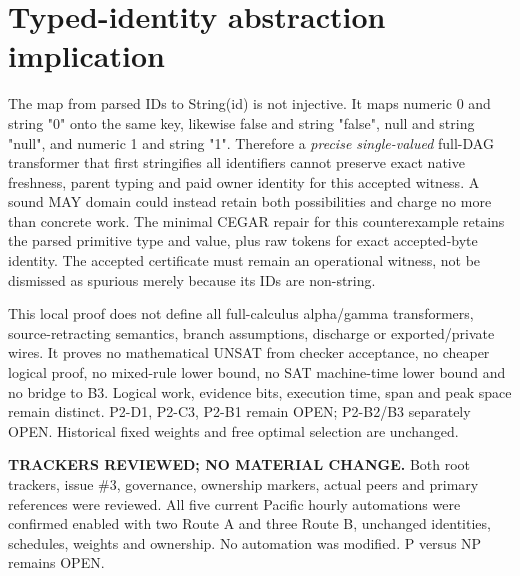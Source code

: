 \documentclass[11pt]{article}
\begin{document}
\section*{Typed-identity abstraction implication}
The map from parsed IDs to String(id) is not injective. It maps numeric 0 and string "0" onto the same key, likewise false and string "false", null and string "null", and numeric 1 and string "1". Therefore a \emph{precise single-valued} full-DAG transformer that first stringifies all identifiers cannot preserve exact native freshness, parent typing and paid owner identity for this accepted witness. A sound MAY domain could instead retain both possibilities and charge no more than concrete work. The minimal CEGAR repair for this counterexample retains the parsed primitive type and value, plus raw tokens for exact accepted-byte identity. The accepted certificate must remain an operational witness, not be dismissed as spurious merely because its IDs are non-string.

This local proof does not define all full-calculus alpha/gamma transformers, source-retracting semantics, branch assumptions, discharge or exported/private wires. It proves no mathematical UNSAT from checker acceptance, no cheaper logical proof, no mixed-rule lower bound, no SAT machine-time lower bound and no bridge to B3. Logical work, evidence bits, execution time, span and peak space remain distinct. P2-D1, P2-C3, P2-B1 remain OPEN; P2-B2/B3 separately OPEN. Historical fixed weights and free optimal selection are unchanged.

\noindent\textbf{TRACKERS REVIEWED; NO MATERIAL CHANGE.}
Both root trackers, issue \#3, governance, ownership markers, actual peers and primary references were reviewed. All five current Pacific hourly automations were confirmed enabled with two Route A and three Route B, unchanged identities, schedules, weights and ownership. No automation was modified. P versus NP remains OPEN.
\end{document}

